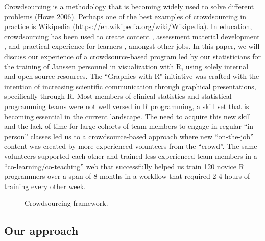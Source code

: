 Crowdsourcing is a methodology that is becoming widely used to solve
different problems (Howe 2006). Perhaps one of the best examples of
crowdsourcing in practice is Wikipedia
(\url{https://en.wikipedia.org/wiki/Wikipedia}). In education,
crowdsourcing has been used to create content \citep{Hills2015},
assessment material development \citep{Alghamdi2015}, and practical
experience for learners \citep{Chen2014}, amongst other jobs. In this
paper, we will discuss our experience of a crowdsource-based program led
by our statisticians for the training of Janssen personnel in
visualization with R, using solely internal and open source resources.
The ``Graphics with R" initiative was crafted with the intention of
increasing scientific communication through graphical presentations,
specifically through R. Most members of clinical statistics and
statistical programming teams were not well versed in R programming, a
skill set that is becoming essential in the current landscape. The need
to acquire this new skill and the lack of time for large cohorts of team
members to engage in regular ``in-person'' classes led us to a
crowdsource-based approach where new ``on-the-job'' content was created
by more experienced volunteers from the ``crowd''. The same volunteers
supported each other and trained less experienced team members in a
``co-learning/co-teaching'' web that successfully helped us train 120
novice R programmers over a span of 8 months in a workflow that required
2-4 hours of training every other week.

\begin{figure}[h]
  \centering
  \caption{Crowdsourcing framework.}
  \label{figure_csfrmwrk}
\end{figure}

\hypertarget{our-approach}{%
\subsection{Our approach}\label{our-approach}}

